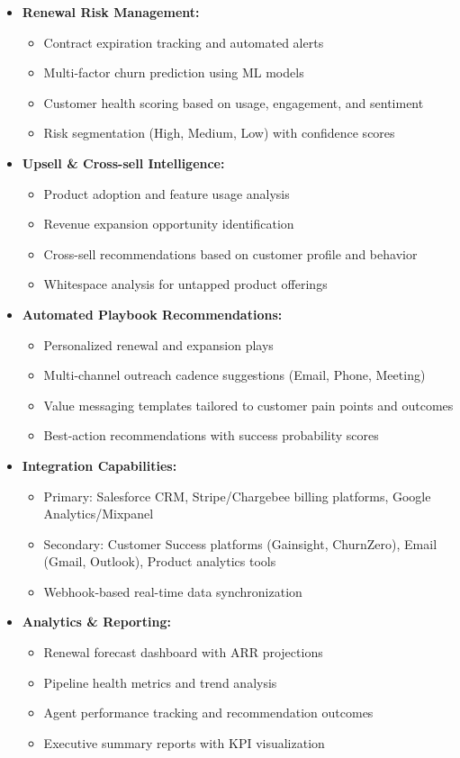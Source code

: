 \documentclass[12pt,a4paper]{article}
\begin{document}
\begin{itemize}
    \item \textbf{Renewal Risk Management:}
    \begin{itemize}
        \item Contract expiration tracking and automated alerts
        \item Multi-factor churn prediction using ML models
        \item Customer health scoring based on usage, engagement, and sentiment
        \item Risk segmentation (High, Medium, Low) with confidence scores
    \end{itemize}
    \item \textbf{Upsell \& Cross-sell Intelligence:}
    \begin{itemize}
        \item Product adoption and feature usage analysis
        \item Revenue expansion opportunity identification
        \item Cross-sell recommendations based on customer profile and behavior
        \item Whitespace analysis for untapped product offerings
    \end{itemize}
    \item \textbf{Automated Playbook Recommendations:}
    \begin{itemize}
        \item Personalized renewal and expansion plays
        \item Multi-channel outreach cadence suggestions (Email, Phone, Meeting)
        \item Value messaging templates tailored to customer pain points and outcomes
        \item Best-action recommendations with success probability scores
    \end{itemize}
    \item \textbf{Integration Capabilities:}
    \begin{itemize}
        \item Primary: Salesforce CRM, Stripe/Chargebee billing platforms, Google Analytics/Mixpanel
        \item Secondary: Customer Success platforms (Gainsight, ChurnZero), Email (Gmail, Outlook), Product analytics tools
        \item Webhook-based real-time data synchronization
    \end{itemize}
    \item \textbf{Analytics \& Reporting:}
    \begin{itemize}
        \item Renewal forecast dashboard with ARR projections
        \item Pipeline health metrics and trend analysis
        \item Agent performance tracking and recommendation outcomes
        \item Executive summary reports with KPI visualization
    \end{itemize}
\end{itemize}
\end{document}
